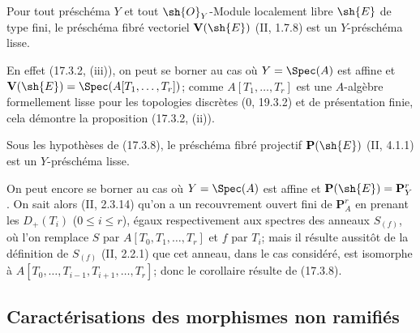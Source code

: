 \begin{proposition}[17.3.8]
\label{IV.17.3.8}
Pour tout préschéma $Y$ et tout $\sh{O}_Y$-Module localement libre $\sh{E}$ de type fini, le préschéma fibré vectoriel $\mathbf{V}(\sh{E})$ (II, 1.7.8) est un $Y$-préschéma lisse.
\end{proposition}

En effet (17.3.2, (iii)), on peut se borner au cas où $Y=\Spec(A)$ est affine et $\mathbf{V}(\sh{E})=\Spec(A[T_1,\ldots,T_r])$; comme $A[T_1,\ldots,T_r]$ est une $A$-algèbre formellement lisse pour les topologies discrètes (0, 19.3.2) et de présentation finie, cela démontre la proposition (17.3.2, (ii)).

\begin{corollary}[17.3.9]
\label{IV.17.3.9}
Sous les hypothèses de (17.3.8), le préschéma fibré projectif $\mathbf{P}(\sh{E})$ (II, 4.1.1) est un $Y$-préschéma lisse.
\end{corollary}

On peut encore se borner au cas où $Y=\Spec(A)$ est affine et $\mathbf{P}(\sh{E})=\mathbf{P}^r_Y$. On sait alors (II, 2.3.14) qu'on a un recouvrement ouvert fini de $\mathbf{P}^r_A$ en prenant les $D_+(T_i)$ ($0\leq i\leq r$), égaux respectivement aux spectres des anneaux $S_{(f)}$, où l'on remplace $S$ par $A[T_0,T_1,\ldots,T_r]$ et $f$ par $T_i$; mais il résulte aussitôt de la définition de $S_{(f)}$ (II, 2.2.1) que cet anneau, dans le cas considéré, est isomorphe à $A[T_0,\ldots,T_{i-1},T_{i+1},\ldots,T_r]$; donc le corollaire résulte de (17.3.8).


\subsection{Caractérisations des morphismes non ramifiés}
\label{subsection:IV.17.4}

